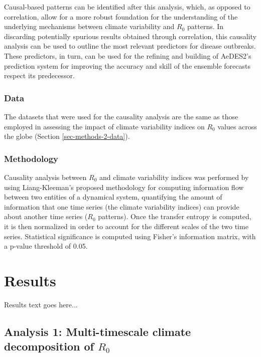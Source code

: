 \documentclass[fleqn,10pt]{wlscirep}
\begin{document}
  Causal-based patterns can be identified after this analysis, which, as opposed to correlation, allow for a more robust foundation for the understanding of the underlying mechanisms between climate variability and $R_0$ patterns. In discarding potentially spurious results obtained through correlation, this causality analysis can be used to outline the most relevant predictors for disease outbreaks. These predictors, in turn, can be used for the refining and building of AeDES2's prediction system for improving the accuracy and skill of the ensemble forecasts respect its predecessor.

  \subsubsection{Data} \label{sec-methods-3-data}

  The datasets that were used for the causality analysis are the same as those employed in assessing the impact of climate variability indices on $R_0$ values across the globe (Section \ref{sec-methods-2-data}).

  \subsubsection{Methodology} \label{sec-methods-3-methodology}

  Causality analysis between $R_0$ and climate variability indices was performed by using Liang-Kleeman's proposed methodology for computing information flow between two entities of a dynamical system, quantifying the amount of information that one time series (the climate variability indices) can provide about another time series ($R_0$ patterns). Once the transfer entropy is computed, it is then normalized in order to account for the different scales of the two time series. Statistical significance is computed using Fisher's information matrix, with a p-value threshold of 0.05.


  \section{Results}

  Results text goes here...

  \subsection{Analysis 1: Multi-timescale climate decomposition of $R_0$} \label{sec-results-1}
\end{document}
